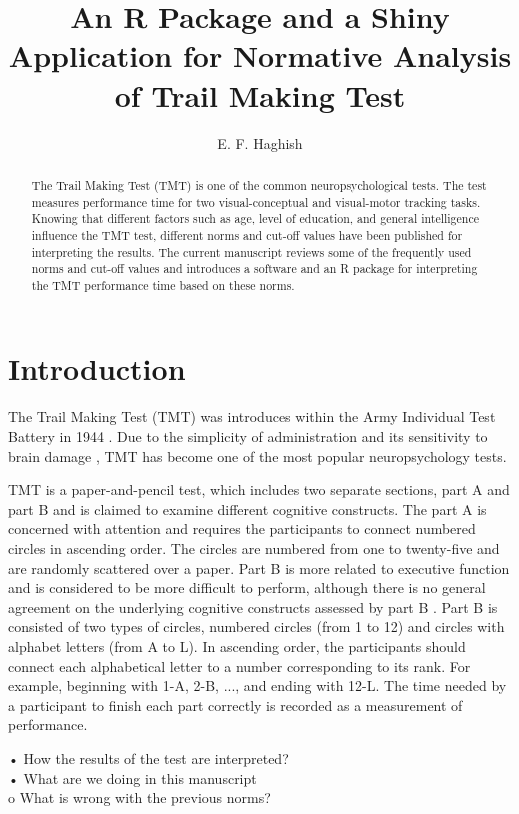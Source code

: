 \documentclass[]{article}
\title{An R Package and a Shiny Application for Normative Analysis of Trail Making Test}
\author{
	E. F. Haghish %
}
\begin{document}
\maketitle

\begin{abstract}
	The Trail Making Test (TMT) is one of the common neuropsychological tests. The test measures performance time for two visual-conceptual and visual-motor tracking tasks. Knowing that different factors such as age, level of education, and general intelligence influence the TMT test, different norms and cut-off values have been published for interpreting the results. The current manuscript reviews some of the frequently used norms and cut-off values and introduces a software and an R package for interpreting the TMT performance time based on these norms.  
\end{abstract}

\section{Introduction}
	The Trail Making Test (TMT) was introduces within the Army Individual Test Battery in 1944 \cite{reitan1985halstead}. Due to the simplicity of administration and its sensitivity to brain damage \cite{reitan1955relation}, TMT has become one of the most popular neuropsychology tests. 
	
	TMT is a paper-and-pencil test, which includes two separate sections, part A and part B and is claimed to examine different cognitive constructs. The part A is concerned with attention \cite{seo2006} and requires the participants to connect numbered circles in ascending order. The circles are numbered from one to twenty-five and are randomly scattered over a paper. Part B is more related to executive function \cite{ble2005, seo2006} and is considered to be more difficult to perform, although there is no general agreement on the underlying cognitive constructs assessed by part B \cite{kortte2002}. Part B is consisted of two types of circles, numbered circles (from 1 to 12) and circles with alphabet letters (from A to L). In ascending order, the participants should connect each alphabetical letter to a number corresponding to its rank. For example, beginning with 1-A, 2-B, ..., and ending with 12-L. The time needed by a participant to finish each part correctly is recorded as a measurement of performance. 
	
	
	•	How the results of the test are interpreted?\\
	•	What are we doing in this manuscript\\
	o	What is wrong with the previous norms?\\
	
\end{document}
